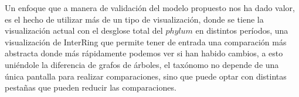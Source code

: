 \documentclass[journal]{IEEEtran}
\begin{document}
Un enfoque que a manera de validación del modelo propuesto nos ha dado valor, es el hecho de utilizar más de un tipo de visualización, donde se tiene la visualización actual con el desglose total del $phylum$ en distintos períodos, una visualización de InterRing que permite tener de entrada una comparación más abstracta donde más rápidamente podemos ver si han habido cambios, a esto uniéndole la diferencia de grafos de árboles, el taxónomo no depende de una única pantalla para realizar comparaciones, sino que puede optar con distintas pestañas que pueden reducir las comparaciones.









%


\end{document}
